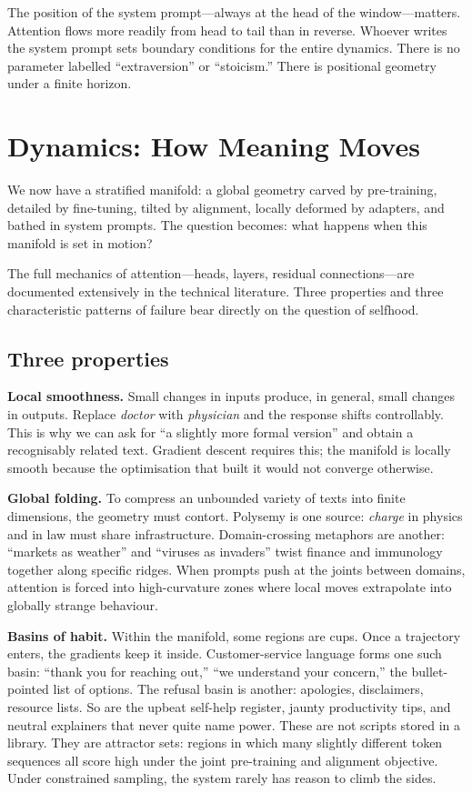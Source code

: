 The position of the system prompt---always at the head of the window---matters. Attention flows more readily from head to tail than in reverse. Whoever writes the system prompt sets boundary conditions for the entire dynamics. There is no parameter labelled ``extraversion'' or ``stoicism.'' There is positional geometry under a finite horizon.


\section{Dynamics: How Meaning Moves}

We now have a stratified manifold: a global geometry carved by pre-training, detailed by fine-tuning, tilted by alignment, locally deformed by adapters, and bathed in system prompts. The question becomes: what happens when this manifold is set in motion?

The full mechanics of attention---heads, layers, residual connections---are documented extensively in the technical literature. Three properties and three characteristic patterns of failure bear directly on the question of selfhood.

\subsection{Three properties}

\textbf{Local smoothness.} Small changes in inputs produce, in general, small changes in outputs. Replace \emph{doctor} with \emph{physician} and the response shifts controllably. This is why we can ask for ``a slightly more formal version'' and obtain a recognisably related text. Gradient descent requires this; the manifold is locally smooth because the optimisation that built it would not converge otherwise.

\textbf{Global folding.} To compress an unbounded variety of texts into finite dimensions, the geometry must contort. Polysemy is one source: \emph{charge} in physics and in law must share infrastructure. Domain-crossing metaphors are another: ``markets as weather'' and ``viruses as invaders'' twist finance and immunology together along specific ridges. When prompts push at the joints between domains, attention is forced into high-curvature zones where local moves extrapolate into globally strange behaviour.

\textbf{Basins of habit.} Within the manifold, some regions are cups. Once a trajectory enters, the gradients keep it inside. Customer-service language forms one such basin: ``thank you for reaching out,'' ``we understand your concern,'' the bullet-pointed list of options. The refusal basin is another: apologies, disclaimers, resource lists. So are the upbeat self-help register, jaunty productivity tips, and neutral explainers that never quite name power. These are not scripts stored in a library. They are attractor sets: regions in which many slightly different token sequences all score high under the joint pre-training and alignment objective. Under constrained sampling, the system rarely has reason to climb the sides.

